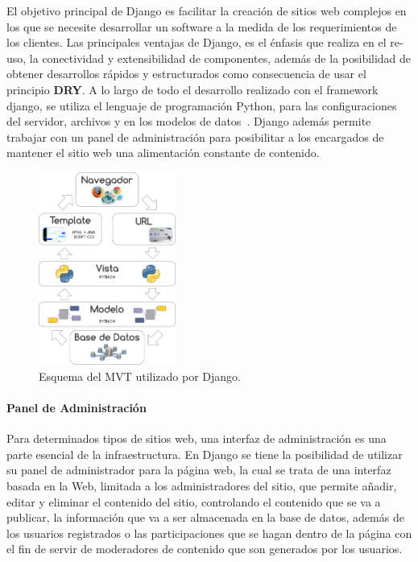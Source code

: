 \documentclass[journal,transmag]{IEEEtran}
\begin{document}
El objetivo principal de Django es facilitar la creación de sitios web complejos en los que se necesite desarrollar un software a la medida de los requerimientos de los clientes. Las principales ventajas de Django, es el énfasis que realiza en el re-uso, la conectividad y extensibilidad de componentes, además de la posibilidad de obtener desarrollos rápidos y estructurados como consecuencia de usar el principio \textbf{DRY}. A lo largo de todo el desarrollo realizado con el framework django, se utiliza el lenguaje de programación Python, para las configuraciones del servidor, archivos y en los modelos de datos~\cite{Wik2014}. Django además permite trabajar con un panel de administración para posibilitar a los encargados de mantener el sitio web una alimentación constante de contenido.

\begin{figure}[t]
\centering
\includegraphics[width=0.4\textwidth]{diagrama_MVC.png}
\caption{Esquema del MVT utilizado por Django.}
\label{fig:esq_Django}
\end{figure}

\paragraph{Panel de Administración}

Para determinados tipos de sitios web, una interfaz de administración es una parte esencial de la infraestructura. En Django se tiene la posibilidad de utilizar su panel de administrador para la página web, la cual se trata de una interfaz basada en la Web, limitada a los administradores del sitio, que permite añadir, editar y eliminar el contenido del sitio, controlando el contenido que se va a publicar, la información que va a ser almacenada en la base de datos, además de los usuarios registrados o las participaciones que se hagan dentro de la página con el fin de servir de moderadores de contenido que son generados por los usuarios. 
\end{document}
